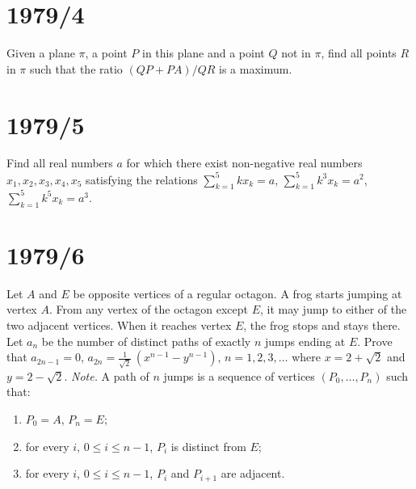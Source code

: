 \documentclass[12pt]{article}
\begin{document}
\section*{1979/4}
Given a plane $\pi$, a point $P$ in this plane and a point $Q$ not in $\pi$, find all points $R$ in $\pi$ such that the ratio $(QP + PA)/QR$ is a maximum.
\section*{1979/5}
Find all real numbers $a$ for which there exist non-negative real numbers $x_1, x_2, x_3, x_4, x_5$ satisfying the relations
$\sum_{k=1}^{5} kx_k = a$,  
$\sum_{k=1}^{5} k^3 x_k = a^2$,  
$\sum_{k=1}^{5} k^5 x_k = a^3$.
\section*{1979/6}
Let $A$ and $E$ be opposite vertices of a regular octagon.  
A frog starts jumping at vertex $A$. From any vertex of the octagon except $E$, it may jump to either of the two adjacent vertices.  
When it reaches vertex $E$, the frog stops and stays there. Let $a_n$ be the number of distinct paths of exactly $n$ jumps ending at $E$.  
Prove that $a_{2n-1} = 0$,  
$a_{2n} = \frac{1}{\sqrt{2}}\,(x^{n-1} - y^{n-1})$, $n=1,2,3,\dots$  
where $x = 2 + \sqrt{2}$ and $y = 2 - \sqrt{2}$.
\medskip
\noindent
\textit{Note.} A path of $n$ jumps is a sequence of vertices $(P_0, \dots, P_n)$ such that:
\begin{enumerate}[label=(\roman*)]
    \item $P_0 = A$, $P_n = E$;
    \item for every $i$, $0 \le i \le n-1$, $P_i$ is distinct from $E$;
    \item for every $i$, $0 \le i \le n-1$, $P_i$ and $P_{i+1}$ are adjacent.
\end{enumerate}
\end{document}
